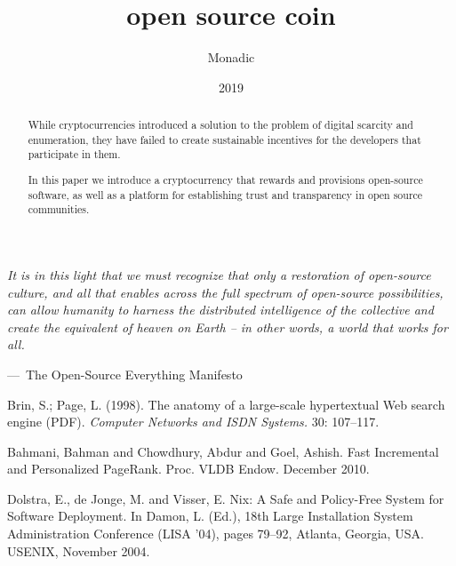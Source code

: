 \documentclass[a4paper, oneside, 9pt, draft]{amsart}
\makeatletter
\newenvironment{epigraph}[2][]
{\leftskip=1cm \def\epigraph@author{#2} \smallskip\itshape}
{\par\vspace{0.5em}\normalfont\hfill---\ \epigraph@author\hspace*{0.2cm}\par\medskip}
\makeatother
\begin{document}
\title[open source coin]{open source coin}
\author{Monadic}
\date{2019}

\maketitle

\begin{abstract}
While cryptocurrencies introduced a solution to the problem of digital scarcity
and enumeration, they have failed to create sustainable incentives for the
developers that participate in them.

In this paper we introduce a cryptocurrency that rewards and provisions
open-source software, as well as a platform for establishing trust and
transparency in open source communities.
\end{abstract}

\setlength{\columnsep}{20pt}
\begin{multicols}{2}

\begin{epigraph}{The Open-Source Everything Manifesto}
    \noindent It is in this light that we must recognize that only a restoration of
    open-source culture, and all that enables across the full spectrum of
    open-source possibilities, can allow humanity to harness the distributed
    intelligence of the collective and create the equivalent of heaven on Earth
    -- in other words, a world that works for all.
\end{epigraph}
\medskip






\end{multicols}

\begin{thebibliography}{9}

 Brin, S.; Page, L. (1998). The anatomy of a
  large-scale hypertextual Web search engine (PDF). \emph{Computer Networks
  and ISDN Systems.} 30: 107–117.

 Bahmani, Bahman and Chowdhury, Abdur and Goel,
  Ashish. Fast Incremental and Personalized PageRank. Proc. VLDB
  Endow. December 2010.

 Dolstra, E., de Jonge, M. and Visser, E. Nix: A Safe and Policy-Free System for Software Deployment. In Damon, L. (Ed.), 18th Large Installation System Administration Conference (LISA '04), pages 79–92, Atlanta, Georgia, USA. USENIX, November 2004.
\end{thebibliography}
\end{document}
